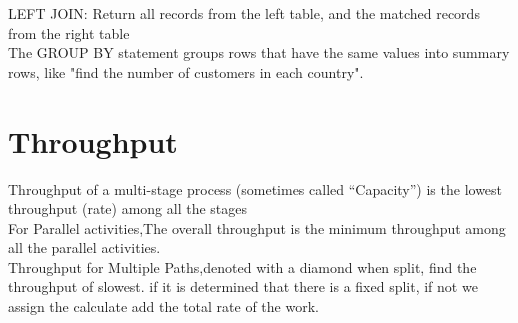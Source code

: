 \documentclass{article}
\begin{document}
LEFT JOIN: Return all records from the left table, and the
matched records from the right table\\The GROUP BY statement groups rows that have the same values into summary rows, like "find the number of customers in each country".\\
\section{Throughput}
Throughput of a multi-stage process (sometimes called
“Capacity”) is the lowest throughput (rate) among all the stages\\
For Parallel activities,The overall throughput is the minimum throughput among all the parallel activities.\\
Throughput for Multiple Paths,denoted with a diamond when split, find the throughput of slowest. if it is determined that there is a fixed split, if not we assign the calculate add the total rate of the work.\\
\end{document}
